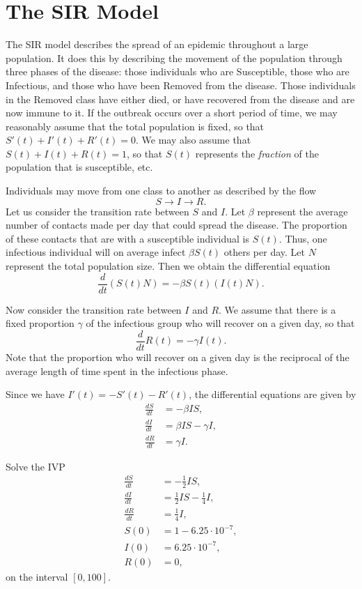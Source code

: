 \section*{The SIR Model}
The SIR model describes the spread of an epidemic throughout a large population. It does this by describing the movement of the population through three phases of the disease: those individuals who are Susceptible, those who are Infectious, and those who have been Removed from the disease. Those individuals in the Removed class have either died, or have recovered from the disease and are now immune to it. If the outbreak occurs over a short period of time, we may reasonably assume that the total population is fixed, so that $S'(t) + I'(t) + R'(t) = 0$.  We may also assume that $S(t) + I(t) + R(t) = 1$, so that $S(t)$ represents the \textit{fraction} of the population that is susceptible, etc. 

Individuals may move from one class to another as described by the flow 
\[S \to I \to R.\] Let us consider the transition rate between $S$ and $I $. Let $\beta$ represent the average number of contacts made per day that could spread the disease. The proportion of these contacts that are with a susceptible individual is $S(t)$. Thus, one infectious individual will on average infect $\beta S(t)$ others per day. Let $N$ represent the total population size. Then we obtain the differential equation
 \[\frac{d}{dt}(S(t) N) = -\beta S(t) (I(t) N).\]
 
 Now consider the transition rate between $I$ and $R$. We assume that there is a fixed proportion $\gamma$ of the infectious group who will recover on a given day, so that 
 \[\frac{d}{dt}R(t) = -\gamma I(t).\]
 Note that the proportion who will recover on a given day is the reciprocal of the average length of time spent in the infectious phase. 
 
 Since we have $I'(t) = - S'(t) - R'(t)$, the  differential equations are given by
\begin{align*}
\frac{dS}{dt} &=-\beta IS ,\\
\frac{dI}{dt} &= \beta I S-\gamma I, \\
\frac{dR}{dt} &=\gamma I.
\end{align*}


\begin{problem}
Solve the IVP
\begin{align*}
\frac{dS}{dt} &=-\frac{1}{2} IS ,\\
\frac{dI}{dt} &= \frac{1}{2} I S-\frac{1}{4} I, \\
\frac{dR}{dt} &=\frac{1}{4} I,\\
S(0) &= 1-6.25\cdot10^{-7},\\
I(0) &= 6.25\cdot10^{-7},\\
R(0) &=0,
\end{align*}
on the interval $[0,100]$. \label{prob_sir1}
\end{problem}

